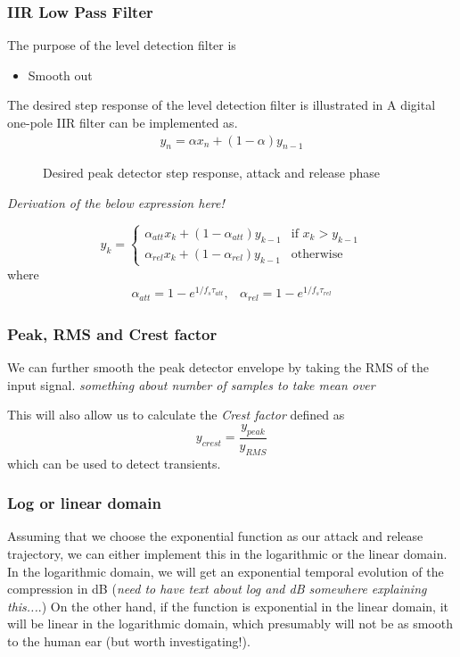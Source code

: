 \documentclass[../main2.tex]{subfiles}
\begin{document}
\subsubsection{IIR Low Pass Filter}
The purpose of the level detection filter is 
\begin{itemize}
\item{Smooth out}
\end{itemize}
The desired step response of the level detection filter is illustrated in  A digital one-pole IIR filter can be implemented as\cite{giannoulis}.
\begin{align}
y_n = \alpha x_{n} + (1-\alpha)y_{n-1}
\end{align}
\begin{figure}[ht]
\centering

\caption{Desired peak detector step response, attack and release phase} 
\label{fig:attack-release-graph}
\end{figure}
\emph{Derivation of the below expression here!}

\begin{equation}
y_k = \left\{
  \begin{array}{ll}
    \alpha_{att} x_k + (1-\alpha_{att})y_{k-1} & \text{if }  x_k > y_{k-1} \\
    \alpha_{rel} x_k + (1-\alpha_{rel})y_{k-1} & \text{otherwise} 
  \end{array}
\right.
\end{equation}
where
\begin{equation}
\begin{array}{lr}
\alpha_{att} = 1-e^{1/f_s \tau_{att}}, & \alpha_{rel} = 1-e^{1/f_s \tau_{rel}}
\end{array}
\end{equation}
\subsubsection{Peak, RMS and Crest factor}
We can further smooth the peak detector envelope by taking the RMS of the input signal. \emph{something about number of samples to take mean over}

This will also allow us to calculate the \emph{Crest factor} defined as
\begin{equation}
y_{crest} = \frac{y_{peak}}{y_{RMS}}
\end{equation}
which can be used to detect transients.

\subsubsection{Log or linear domain}
Assuming that we choose the exponential function as our attack and release trajectory, we can either implement this in the logarithmic or the linear domain. In the logarithmic domain, we will get an exponential temporal evolution of the compression in dB (\emph{need to have text about log and dB somewhere explaining this...}.) On the other hand, if the function is exponential in the linear domain, it will be linear in the logarithmic domain, which presumably will not be as smooth to the human ear (but worth investigating!).
\end{document}

